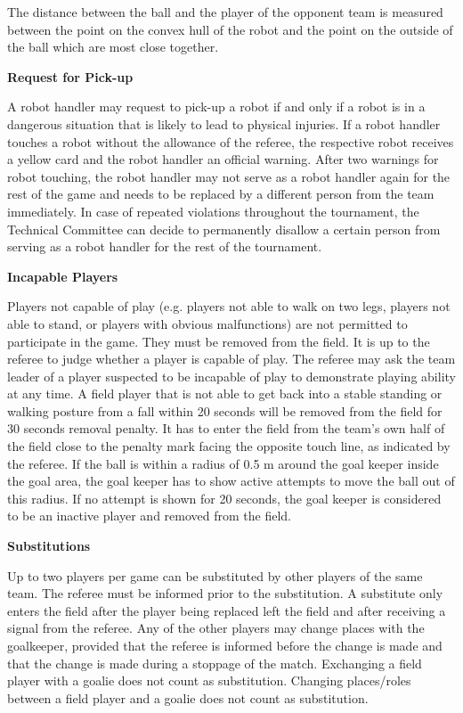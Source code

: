 The distance between the ball and the player of the opponent team is measured between the point on the convex hull of the robot and the point on the outside of the ball which are most close together.

\color{black}

\bigskip


{\bfseries Request for Pick-up}

A robot handler may request to pick-up a robot if and only if a robot is in a dangerous situation that is likely to lead to physical injuries. If a robot handler touches a robot without the allowance of the referee, the respective robot receives a yellow card and the robot handler an official warning. After two warnings for robot touching, the robot handler may not serve as a robot handler again for the rest of the game and needs to be replaced by a different person from the team immediately. In case of repeated violations throughout the tournament, the Technical Committee can decide to permanently disallow a certain person from serving as a robot handler for the rest of the tournament.
\color{black}

\bigskip

{\bfseries Incapable Players}

Players not capable of play (e.g. players not able to walk on two legs, players not able to stand, or players with obvious malfunctions) are not permitted to participate in the game. They must be removed from the field. It is up to the referee to judge whether a player is capable of play. The referee may ask the team leader of a player suspected to be incapable of play to demonstrate playing ability at any time. A field player that is not able to get back into a stable standing or walking posture from a fall within 20 seconds will be removed from the field for 30 seconds removal penalty. It has to enter the field from the team's own half of the field close to the penalty mark facing the opposite touch line, as indicated by the referee. If the ball is within a radius of 0.5 m around the goal keeper inside the goal area, the goal keeper has to show active attempts to move the ball out of this radius. If no attempt is shown for 20 seconds, the goal keeper is considered to be an inactive player and removed from the field.

\bigskip

{\bfseries Substitutions}

Up to two players per game can be substituted by other players of the same team. The referee must be informed prior to the substitution. A substitute only enters the field after the player being replaced left the field and after receiving a signal from the referee. Any of the
other players may change places with the goalkeeper, provided that the referee is informed before the change is made and that the change is made during a stoppage of the match. Exchanging a field player with a goalie does not count as substitution. Changing places/roles between a
field player and a goalie does not count as substitution.

